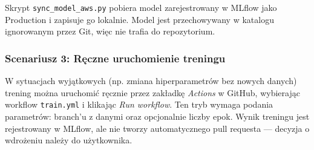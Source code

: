 Skrypt \texttt{sync\_model\_aws.py} pobiera model zarejestrowany w MLflow jako Production i zapisuje go lokalnie. Model jest przechowywany w katalogu ignorowanym przez Git, więc nie trafia do repozytorium.

\subsubsection{Scenariusz 3: Ręczne uruchomienie treningu}

W sytuacjach wyjątkowych (np. zmiana hiperparametrów bez nowych danych) trening można uruchomić ręcznie przez zakładkę \textit{Actions} w GitHub, wybierając workflow \texttt{train.yml} i klikając \textit{Run workflow}. Ten tryb wymaga podania parametrów: branch'u z danymi oraz opcjonalnie liczby epok. Wynik treningu jest rejestrowany w MLflow, ale nie tworzy automatycznego pull requesta --- decyzja o wdrożeniu należy do użytkownika.

